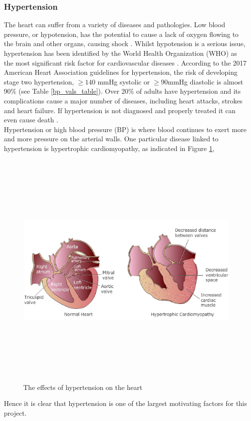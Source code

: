 \subsubsection{Hypertension}
The heart can suffer from a variety of diseases and pathologies. Low blood 
pressure, or hypotension, has the potential to cause  a lack of oxygen 
flowing to the  brain  and  other  organs, causing shock \cite{Tanveer2018}. 
Whilst hypotension is a serious issue, hypertension has been identified by 
the World Health Organization (WHO) as the most significant risk factor for 
cardiovascular diseases \cite{Wang2018}. According to the 2017 American Heart 
Association guidelines for hypertension, the risk of developing stage two 
hypertension, $\ge 140$ mmHg systolic or $\ge 90$mmHg diastolic is almost 
90\% \cite{Bard2019} (see Table \ref{bp_vals_table}). Over 20\% of adults have 
hypertension  and  its  complications  cause  a  major  number  of  
diseases, including heart attacks, strokes and heart failure. If 
hypertension is not diagnosed and properly treated it can even cause 
death \cite{Janjua2017}.\\ \newline \noindent  Hypertension or high blood pressure (BP) is where blood continues to exert more and more pressure on the arterial walls. One particular disease linked to hypertension is hypertrophic cardiomyopathy, as indicated in Figure \ref{hypertension}, \begin{figure}[H]
    \centering
    \includegraphics[width=12cm,height=12cm,keepaspectratio]{Background/hypertension.jpeg}
    \caption{The effects of hypertension on the heart \cite{hypertrophic}}
    \label{hypertension}
\end{figure} \noindent Hence it is clear that hypertension is one of the largest motivating factors for this project.

